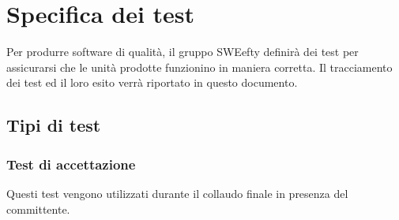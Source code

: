 \section{Specifica dei test}
Per produrre software di qualità, il gruppo SWEefty definirà dei test per assicurarsi che le unità prodotte funzionino in maniera corretta. Il tracciamento dei test ed il loro esito verrà riportato in questo documento.
	\subsection{Tipi di test}
	
		\subsubsection{Test di accettazione}
	Questi test vengono utilizzati durante il collaudo finale in presenza del committente.
	
